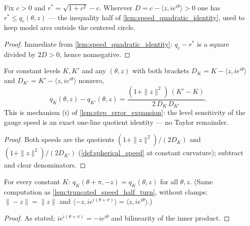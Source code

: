 \begin{lemma}
  \label{lem:speed_radius_le}
  Fix $c>0$ and $r^\ast=\sqrt{1+c^2}-c$. Wherever
  $D=c-\langle z,ie^{i\theta}\rangle>0$ one has $r^\ast\le q_c(\theta,z)$ — the
  inequality half of \cref{lem:speed_quadratic_identity}, used to keep model arcs
  outside the centered circle.
\end{lemma}

\begin{proof}
  \leanok
  Immediate from \cref{lem:speed_quadratic_identity}: $q_c-r^\ast$ is a square divided
  by $2D>0$, hence nonnegative.
\end{proof}

\begin{lemma}
  \label{lem:speed_level_sensitivity}
  For constant levels $K,K'$ and any $(\theta,z)$ with both brackets
  $D_K=K-\langle z,ie^{i\theta}\rangle$ and $D_{K'}=K'-\langle z,ie^{i\theta}\rangle$
  nonzero,
  \[
    q_K(\theta,z)-q_{K'}(\theta,z)=\frac{(1+\|z\|^2)\,(K'-K)}{2\,D_K\,D_{K'}} .
  \]
  This is mechanism (i) of \cref{lem:step_error_expansion}: the level sensitivity of
  the gauge speed is an exact one-line quotient identity — no Taylor remainder.
\end{lemma}

\begin{proof}

\leanok
  Both speeds are the quotients $(1+\|z\|^2)/(2D_K)$ and $(1+\|z\|^2)/(2D_{K'})$
  (\cref{def:spherical_speed} at constant curvature); subtract and clear denominators.
\end{proof}

\begin{lemma}
  \label{lem:spherical_speed_half_turn}
  For every constant $K$: $q_K(\theta+\pi,-z)=q_K(\theta,z)$ for all $\theta,z$. (Same
  computation as \cref{lem:truncated_speed_half_turn}, without clamps: $\|-z\|=\|z\|$ and
  $\langle -z,ie^{i(\theta+\pi)}\rangle=\langle z,ie^{i\theta}\rangle$.)
\end{lemma}

\begin{proof}
  \leanok
  As stated; $ie^{i(\theta+\pi)}=-ie^{i\theta}$ and bilinearity of the inner product.
\end{proof}

